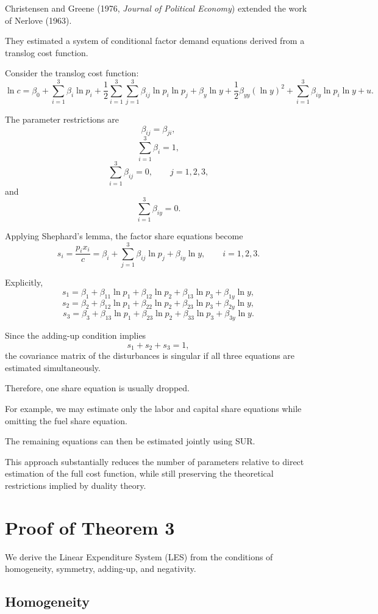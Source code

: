 Christensen and Greene (1976, \emph{Journal of Political Economy})
extended the work of Nerlove (1963).

They estimated a system of conditional factor demand equations derived from a translog cost function.

Consider the translog cost function:
\[
\ln c
=
\beta_0
+
\sum_{i=1}^3
\beta_i\ln p_i
+
\frac12
\sum_{i=1}^3
\sum_{j=1}^3
\beta_{ij}\ln p_i\ln p_j
+
\beta_y\ln y
+
\frac12
\beta_{yy}(\ln y)^2
+
\sum_{i=1}^3
\beta_{iy}\ln p_i\ln y
+
u.
\]

The parameter restrictions are
\[
\beta_{ij}=\beta_{ji},
\]
\[
\sum_{i=1}^3\beta_i=1,
\]
\[
\sum_{i=1}^3\beta_{ij}=0,
\qquad
j=1,2,3,
\]
and
\[
\sum_{i=1}^3\beta_{iy}=0.
\]

Applying Shephard's lemma,
the factor share equations become
\[
s_i
=
\frac{p_ix_i}{c}
=
\beta_i
+
\sum_{j=1}^3
\beta_{ij}\ln p_j
+
\beta_{iy}\ln y,
\qquad
i=1,2,3.
\]

Explicitly,
\[
s_1
=
\beta_1
+
\beta_{11}\ln p_1
+
\beta_{12}\ln p_2
+
\beta_{13}\ln p_3
+
\beta_{1y}\ln y,
\]
\[
s_2
=
\beta_2
+
\beta_{12}\ln p_1
+
\beta_{22}\ln p_2
+
\beta_{23}\ln p_3
+
\beta_{2y}\ln y,
\]
\[
s_3
=
\beta_3
+
\beta_{13}\ln p_1
+
\beta_{23}\ln p_2
+
\beta_{33}\ln p_3
+
\beta_{3y}\ln y.
\]

Since the adding-up condition implies
\[
s_1+s_2+s_3=1,
\]
the covariance matrix of the disturbances is singular if all three equations are estimated simultaneously.

Therefore,
one share equation is usually dropped.

For example,
we may estimate only the labor and capital share equations while omitting the fuel share equation.

The remaining equations can then be estimated jointly using SUR.

This approach substantially reduces the number of parameters relative to direct estimation of the full cost function,
while still preserving the theoretical restrictions implied by duality theory.


\section{Proof of Theorem 3}

We derive the Linear Expenditure System (LES) from the conditions of homogeneity, symmetry, adding-up, and negativity.

\subsection{Homogeneity}

